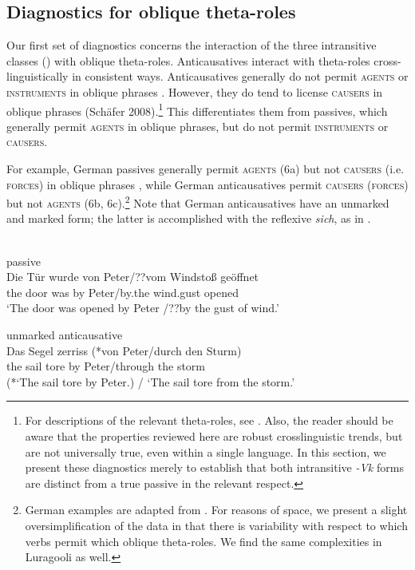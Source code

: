 \documentclass[output=paper]{langsci/lanmgscibook}
\begin{document}
\subsection{Diagnostics for oblique theta-roles} %

Our first set of diagnostics concerns the interaction of the three intransitive classes () with oblique theta-roles. Anticausatives interact with theta-roles cross-linguistically in consistent ways. Anticausatives generally do not permit \textsc{agents} or \textsc{instruments} in oblique phrases \citep{Levin1995}. However, they do tend to license \textsc{causers} in oblique phrases (Schäfer 2008).\footnote{For descriptions of the relevant theta-roles, see \citet{Levin1995}. Also, the reader should be aware that the properties reviewed here are robust crosslinguistic trends, but are not universally true, even within a single language. In this section, we present these diagnostics merely to establish that both intransitive \textit{-Vk} forms are distinct from a true passive in the relevant respect.} This differentiates them from passives, which generally permit \textsc{agents} in oblique phrases, but do not permit \textsc{instruments} or \textsc{causers}.

For example, German passives generally permit \textsc{agents (6}a) but not \textsc{causers (}i.e. \textsc{forces}) in oblique phrases , while German anticausatives permit \textsc{causers} (\textsc{forces}) but not \textsc{agents} (6b, 6c).\footnote{{} German examples are adapted from \citet{Schäfer2008}. For reasons of space, we present a slight oversimplification of the data in that there is variability with respect to which verbs permit which oblique theta-roles. We find the same complexities in Luragooli as well.}\textsuperscript{}  Note that German anticausatives have an unmarked and marked form; the latter is accomplished with the reflexive \textit{sich}, as in .

\ea\label{ex:gluckman:6} 
\\
\ea\label{ex:gluckman:6a}
{{passive}}\\
\gll   Die Tür wurde von Peter/??vom      Windstoß  geöffnet\\
       the door was    by   Peter/by.the  wind.gust   opened\\
\glt ‘The door was opened by Peter /??by the gust of wind.’

\ex\label{ex:gluckman:6b}
{{unmarked anticausative}}\\
\gll   Das Segel zerriss (*von Peter/durch den Sturm)\\
       the  sail    tore        by    Peter/through the storm\\
\glt (*‘The sail tore by Peter.) / ‘The sail tore from the storm.’
\end{document}
